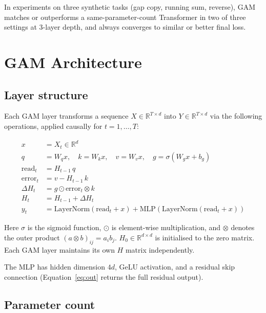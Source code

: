 \documentclass[11pt,a4paper]{article}
\begin{document}
In experiments on three synthetic tasks (gap copy, running sum, reverse),
GAM matches or outperforms a same-parameter-count Transformer in
two of three settings at 3-layer depth, and always converges to similar
or better final loss.

\section{GAM Architecture}
\label{sec:arch}

\subsection{Layer structure}
\label{sec:layer}

Each GAM layer transforms a sequence $X \in \mathbb{R}^{T \times d}$
into $Y \in \mathbb{R}^{T \times d}$ via the following operations,
applied causally for $t = 1, \dots, T$:

\begin{align}
  x &= X_t \in \mathbb{R}^d \nonumber\\
  q &= W_q x, \quad
  k = W_k x, \quad
  v = W_v x, \quad
  g = \sigma(W_g x + b_g) \label{eq:proj} \\[2mm]
  \text{read}_t &= H_{t-1}\, q \label{eq:read} \\
  \text{error}_t &= v - H_{t-1}\, k \label{eq:error} \\
  \Delta H_t &= g \odot \text{error}_t \otimes k \label{eq:update} \\
  H_t &= H_{t-1} + \Delta H_t \label{eq:step} \\[2mm]
  y_t &= \text{LayerNorm}(\text{read}_t + x) + \text{MLP}(\text{LayerNorm}(\text{read}_t + x)) \label{eq:out}
\end{align}

Here $\sigma$ is the sigmoid function, $\odot$ is element-wise
multiplication, and $\otimes$ denotes the outer product
$(a \otimes b)_{ij} = a_i b_j$.
$H_0 \in \mathbb{R}^{d \times d}$ is initialised to the zero matrix.
Each GAM layer maintains its own $H$ matrix independently.

The MLP has hidden dimension $4d$, GeLU activation, and a residual
skip connection (Equation~\ref{eq:out} returns the full residual output).

\subsection{Parameter count}
\label{sec:params}
\end{document}
